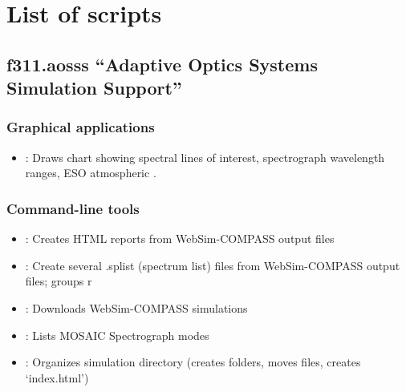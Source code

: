 \documentclass[letterpaper,10pt,english]{sphinxmanual}
\begin{document}
\section{List of scripts}
\label{\detokenize{intro:list-of-scripts}}

\subsection{f311.aosss \textendash{} “Adaptive Optics Systems Simulation Support”}
\label{\detokenize{intro:f311-aosss-adaptive-optics-systems-simulation-support}}

\subsubsection{Graphical applications}
\label{\detokenize{intro:graphical-applications}}\begin{itemize}
\item {} 
{\hyperref[\detokenize{autoscripts/script-wavelength-chart::doc}]{}}: Draws chart showing spectral lines of interest, spectrograph wavelength ranges, ESO atmospheric .

\end{itemize}


\subsubsection{Command-line tools}
\label{\detokenize{intro:command-line-tools}}\begin{itemize}
\item {} 
{\hyperref[\detokenize{autoscripts/script-create-simulation-reports::doc}]{}}: Creates HTML reports from WebSim-COMPASS output files

\item {} 
{\hyperref[\detokenize{autoscripts/script-create-spectrum-lists::doc}]{}}: Create several .splist (spectrum list) files from WebSim-COMPASS output files; groups r

\item {} 
{\hyperref[\detokenize{autoscripts/script-get-compass::doc}]{}}: Downloads WebSim-COMPASS simulations

\item {} 
{\hyperref[\detokenize{autoscripts/script-list-mosaic-modes::doc}]{}}: Lists MOSAIC Spectrograph modes

\item {} 
{\hyperref[\detokenize{autoscripts/script-organize-directory::doc}]{}}: Organizes simulation directory (creates folders, moves files, creates ‘index.html’)

\end{itemize}
\end{document}
